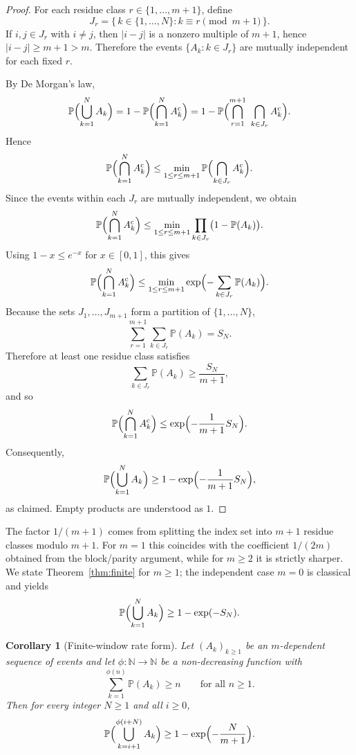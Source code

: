\documentclass[11pt]{article}
\newtheorem{corollary}[theorem]{Corollary}
\begin{document}
\begin{proof}
For each residue class $r\in\{1,\dots,m+1\}$, define
\[
  J_r=\{\,k\in\{1,\dots,N\}: k\equiv r \pmod{m+1}\,\}.
\]
If $i,j\in J_r$ with $i\ne j$, then $|i-j|$ is a nonzero multiple of
$m+1$, hence $|i-j|\ge m+1>m$.  Therefore the events
$\{A_k:k\in J_r\}$ are mutually independent for each fixed $r$.

By De Morgan's law,
\[
  \mathbb{P}\Bigl(\bigcup_{k=1}^N A_k\Bigr)
  =1-\mathbb{P}\Bigl(\bigcap_{k=1}^N A_k^{\mathrm c}\Bigr)
  =1-\mathbb{P}\Bigl(\bigcap_{r=1}^{m+1}\ \bigcap_{k\in J_r} A_k^{\mathrm c}\Bigr).
\]
Hence
\[
  \mathbb{P}\Bigl(\bigcap_{k=1}^N A_k^{\mathrm c}\Bigr)
  \le
  \min_{1\le r\le m+1}
  \mathbb{P}\Bigl(\bigcap_{k\in J_r} A_k^{\mathrm c}\Bigr).
\]
Since the events within each $J_r$ are mutually independent, we obtain
\[
  \mathbb{P}\Bigl(\bigcap_{k=1}^N A_k^{\mathrm c}\Bigr)
  \le
  \min_{1\le r\le m+1}
  \prod_{k\in J_r}\bigl(1-\mathbb{P}(A_k)\bigr).
\]
Using $1-x\le e^{-x}$ for $x\in[0,1]$, this gives
\[
  \mathbb{P}\Bigl(\bigcap_{k=1}^N A_k^{\mathrm c}\Bigr)
  \le
  \min_{1\le r\le m+1}
  \exp\Bigl(-\sum_{k\in J_r}\mathbb{P}(A_k)\Bigr).
\]
Because the sets $J_1,\dots,J_{m+1}$ form a partition of
$\{1,\dots,N\}$,
\[
  \sum_{r=1}^{m+1}\sum_{k\in J_r}\mathbb{P}(A_k)=S_N.
\]
Therefore at least one residue class satisfies
\[
  \sum_{k\in J_r}\mathbb{P}(A_k)\ge \frac{S_N}{m+1},
\]
and so
\[
  \mathbb{P}\Bigl(\bigcap_{k=1}^N A_k^{\mathrm c}\Bigr)
  \le \exp\Bigl(-\frac{1}{m+1}S_N\Bigr).
\]
Consequently,
\[
  \mathbb{P}\Bigl(\bigcup_{k=1}^N A_k\Bigr)
  \ge 1-\exp\Bigl(-\frac{1}{m+1}S_N\Bigr),
\]
as claimed.  Empty products are understood as $1$.
\end{proof}


The factor $1/(m+1)$ comes from splitting the index set into $m+1$
residue classes modulo $m+1$.  For $m=1$ this coincides with the
coefficient $1/(2m)$ obtained from the block/parity argument, while for
$m\ge2$ it is strictly sharper.  We state Theorem~\ref{thm:finite} for
$m\ge1$; the independent case $m=0$ is classical and yields
\[
  \mathbb{P}\Bigl(\bigcup_{k=1}^N A_k\Bigr)\ge 1-\exp(-S_N).
\]

\begin{corollary}[Finite-window rate form]
\label{cor:window}
Let $(A_k)_{k\geq1}$ be an $m$-dependent sequence of events and let
\(\phi:\mathbb{N}\to\mathbb{N}\) be a non-decreasing function with
\[
  \sum_{k=1}^{\phi(n)} \mathbb{P}(A_k)\ge n
  \qquad\text{for all } n\ge 1.
\]
Then for every integer $N\ge1$ and all $i\ge0$,
\[
  \mathbb{P}\Bigl( \bigcup_{k=i+1}^{\phi(i+N)} A_k \Bigr)
  \ge 1 - \exp\Bigl(-\frac{N}{m+1}\Bigr).
\]
\end{corollary}
\end{document}
